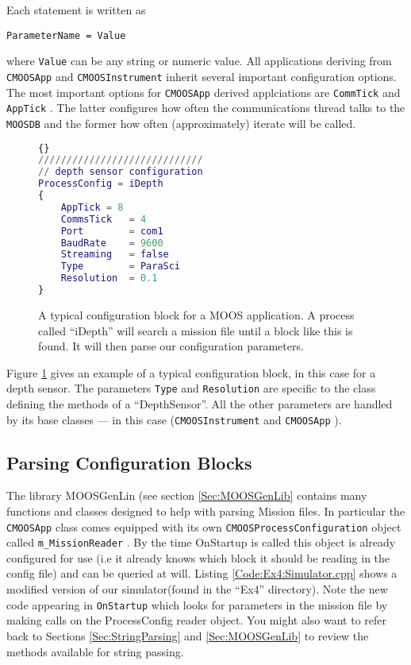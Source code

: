 \documentclass[a4paper,10pt]{article}
\newcommand{\Code}[1]{\texttt{#1} }
\newcommand{\code}[1]{\Code{#1} }
\begin{document}
Each statement is written as
\begin{center}
\code{ParameterName = Value}
\end{center}
where \code{Value} can be any string or numeric value. All
applications deriving from \code{CMOOSApp} and
\code{CMOOSInstrument} inherit several important configuration
options. The most important options for \code{CMOOSApp} derived applciations
are  \code{CommTick} and \code{AppTick}. The latter configures how often the
communications thread talks to the \code{MOOSDB} and the former how often (approximately)
iterate will be called.


\begin{figure}\label{fig:ProcConfig}
\caption{A typical configuration block for a MOOS application. A
process called ``iDepth'' will search a mission file until a block
like this is found. It will then parse our configuration
parameters.}
\begin{lstlisting}[language = {matlab}]{}
/////////////////////////////
// depth sensor configuration
ProcessConfig = iDepth
{
    AppTick = 8
    CommsTick   = 4
    Port        = com1
    BaudRate    = 9600
    Streaming   = false
    Type        = ParaSci
    Resolution  = 0.1
}
\end{lstlisting}
\end{figure}
Figure \ref{fig:ProcConfig} gives an example of a typical
configuration block, in this case for a depth sensor. The
parameters \code{Type} and \code{Resolution} are specific to the
class defining the methods of a ``DepthSensor''. All the other
parameters are handled by its base classes
--- in this case (\code{CMOOSInstrument} and \code{CMOOSApp}).

\subsection{Parsing Configuration Blocks}

The library MOOSGenLin (see section \ref{Sec:MOOSGenLib} contains many functions and classes
designed to help with parsing Mission files. In particular the \code{CMOOSApp} class comes equipped with its own
\code{CMOOSProcessConfiguration} object called \code{m\_MissionReader}. By the time OnStartup is called this object is already configured for use (i.e it already knows which block it should be reading in the config file) and can be queried at will.
Listing \ref{Code:Ex4:Simulator.cpp} shows a modified version of our simulator(found in the ``Ex4'' directory). Note the new code appearing in \code{OnStartup} which looks for parameters in the mission file by making calls on the ProcessConfig reader object. You might also want to refer back to Sections \ref{Sec:StringParsing} and  \ref{Sec:MOOSGenLib}  to review the methods available for string passing.
\end{document}
